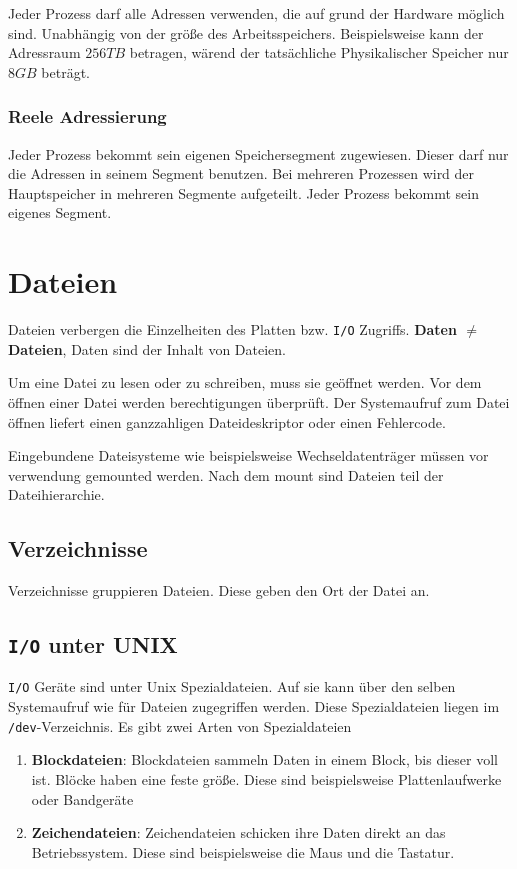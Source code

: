 Jeder Prozess darf alle Adressen verwenden, die auf grund der Hardware möglich sind. Unabhängig von der größe des Arbeitsspeichers. Beispielsweise kann der Adressraum $256TB$ betragen, wärend der tatsächliche Physikalischer Speicher nur $8GB$ beträgt.

\subsubsection{Reele Adressierung}

Jeder Prozess bekommt sein eigenen Speichersegment zugewiesen. Dieser darf nur die Adressen in seinem Segment benutzen. Bei mehreren Prozessen wird der Hauptspeicher in mehreren Segmente aufgeteilt. Jeder Prozess bekommt sein eigenes Segment. 

\section{Dateien}

Dateien verbergen die Einzelheiten des Platten bzw. \texttt{I/O} Zugriffs. \textbf{Daten $\neq$ Dateien}, Daten sind der Inhalt von Dateien.

Um eine Datei zu lesen oder zu schreiben, muss sie geöffnet werden. Vor dem öffnen einer Datei werden berechtigungen überprüft. Der Systemaufruf zum Datei öffnen liefert einen ganzzahligen Dateideskriptor oder einen Fehlercode. 

Eingebundene Dateisysteme wie beispielsweise Wechseldatenträger müssen vor verwendung gemounted werden. Nach dem mount sind Dateien teil der Dateihierarchie. 

\subsection{Verzeichnisse}

Verzeichnisse gruppieren Dateien. Diese geben den Ort der Datei an. 

\subsection{\texttt{I/O} unter UNIX}

\texttt{I/O} Geräte sind unter Unix Spezialdateien. Auf sie kann über den selben Systemaufruf wie für Dateien zugegriffen werden. Diese Spezialdateien liegen im \texttt{/dev}-Verzeichnis. Es gibt zwei Arten von Spezialdateien

\begin{enumerate}
    \item \textbf{Blockdateien}: Blockdateien sammeln Daten in einem Block, bis dieser voll ist. Blöcke haben eine feste größe. Diese sind beispielsweise Plattenlaufwerke oder Bandgeräte
    \item \textbf{Zeichendateien}: Zeichendateien schicken ihre Daten direkt an das Betriebssystem. Diese sind beispielsweise die Maus und die Tastatur.
\end{enumerate}

